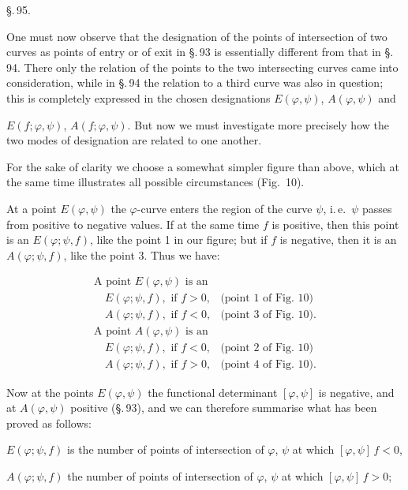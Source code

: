 \begin{center}
\S.\,95.

\end{center}

One must now observe that the designation of the points of intersection
of two curves as points of entry or of exit in \S.\,93
is essentially different from that in \S.\,94. There only
the relation of the points to the two intersecting
curves came into consideration, while in \S.\,94 the relation to
a third curve was also in question; this is completely expressed in the chosen
designations $E(\varphi, \psi)$, $A(\varphi, \psi)$ and


$E(f; \varphi, \psi)$, $A(f; \varphi, \psi)$. But now we must
investigate more precisely how the two modes of designation
are related to one another.

For the sake of clarity we choose a somewhat simpler
figure than above, which at the same time illustrates all possible
circumstances (Fig.~10).

At a point $E(\varphi, \psi)$ the $\varphi$-curve enters the region
of the curve $\psi$, i.\,e.\ $\psi$ passes from positive to negative
values. If at the same time $f$ is positive, then this point is an
$E(\varphi; \psi, f)$, like the point 1 in our figure; but if $f$ is negative,
then it is an $A(\varphi; \psi, f)$, like the point 3. Thus we have:

\[
\begin{array}{ll}
\text{A point } E(\varphi, \psi) \text{ is an} & \\
\quad E(\varphi; \psi, f), \text{ if } f > 0, & \text{(point 1 of Fig. 10)} \\
\quad A(\varphi; \psi, f), \text{ if } f < 0, & \text{(point 3 of Fig. 10).} \\
\text{A point } A(\varphi, \psi) \text{ is an} & \\
\quad E(\varphi; \psi, f), \text{ if } f < 0, & \text{(point 2 of Fig. 10)} \\
\quad A(\varphi; \psi, f), \text{ if } f > 0, & \text{(point 4 of Fig. 10).}
\end{array}
\]

Now at the points $E(\varphi, \psi)$ the functional determinant
$[\varphi, \psi]$ is negative, and at $A(\varphi, \psi)$ positive (\S.\,93), and we can
therefore summarise what has been proved as follows:

$E(\varphi; \psi, f)$ is the number of points of intersection of $\varphi$, $\psi$ at
which $[\varphi, \psi]\, f < 0$,

$A(\varphi; \psi, f)$ the number of points of intersection of $\varphi$, $\psi$ at
which $[\varphi, \psi]\, f > 0$;
